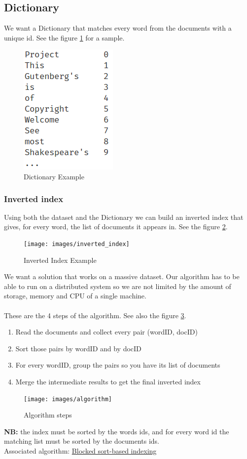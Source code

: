 \documentclass[12pt,french,titlepage]{article}
\begin{document}
\subsection{Dictionary}
We want a Dictionary that matches every word from the documents with a unique id. See the figure \ref{fig:Dictionary} for a sample.
\begin{figure}[H]
    \centering
    \includegraphics[scale=0.75]{images/Dictionary}
    \caption{Dictionary Example}
    \label{fig:Dictionary}
\end{figure}
\subsubsection{Inverted index}
Using both the dataset and the Dictionary we can build an inverted index that gives, for every word, the list of documents it appears in. See the figure \ref{fig:inverted_index}.
\begin{figure}[H]
    \centering
    \texttt{[image: images/inverted\_index]}
    \caption{Inverted Index Example}
    \label{fig:inverted_index}
\end{figure}
We want a solution that works on a massive dataset. Our algorithm has to be able to run on a distributed system so we are not limited by the amount of storage, memory and CPU of a single machine. 
\\\\
These are the 4 steps of the algorithm. See also the figure \ref{fig:algorithm_steps}.
\begin{enumerate}
    \item Read the documents and collect every pair (wordID, docID)
    \item Sort those pairs by wordID and by docID
    \item For every wordID, group the pairs so you have its list of documents
    \item Merge the intermediate results to get the final inverted index
\end{enumerate}
\begin{figure}[H]
    \centering
    \texttt{[image: images/algorithm]}
    \caption{Algorithm steps}
    \label{fig:algorithm_steps}
\end{figure}
\textbf{NB:} the index must be sorted by the words ids, and for every word id the matching list must be sorted by the documents ids.
\\
Associated algorithm: \href{https://nlp.stanford.edu/IR-book/html/htmledition/blocked-sort-based-indexing-1.html}{\underline{Blocked sort-based indexing}}
\end{document}
